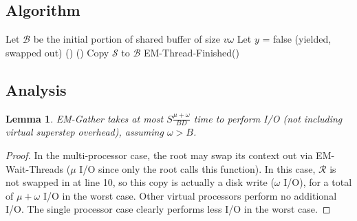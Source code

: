 \documentclass[12pt]{carletoncsthesis}
\newtheorem{lemma}[thm]{Lemma}
\begin{document}
\subsection{Algorithm}


\begin{algorithm}
\BlankLine
Let $\mathcal{B}$ be the initial portion of shared buffer of size $v\omega$\;
Let $y$ = false (yielded, swapped out)\;
\Else(){
	\Else(){
		Copy $\mathcal{S}$ to $\mathcal{B}$\;
		{\sc EM-Thread-Finished()}\;
	}
}
\BlankLine{}\BlankLine
\caption{{\sc EM-Gather}}
\label{gather-alg}
\end{algorithm}


\clearpage
\subsection{Analysis}


\begin{lemma}
\label{em-gather-io}
{\sc EM-Gather} takes at most $S\frac{\mu + \omega}{BD}$ time to perform I/O
(not including virtual superstep overhead), assuming $\omega > B$.
\end{lemma}
\begin{proof}
In the multi-processor case, the root may swap its context out via {\sc
EM-Wait-Threads} ($\mu$ I/O since only the root calls this function).
In this case, $\mathcal{R}$ is not swapped in at line 10, so this copy is
actually a disk write ($\omega$ I/O), for a total of $\mu + \omega$ I/O
in the worst case.  Other virtual processors perform no additional I/O.
The single processor case clearly performs less I/O in the worst case.
\end{proof}
\end{document}
